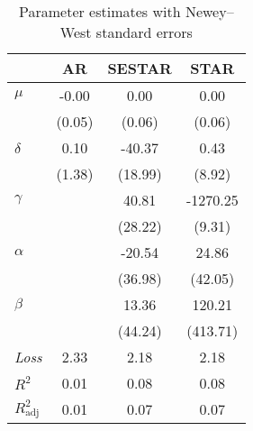\begin{table}[htbp]
\centering
\caption{Parameter estimates with Newey--West standard errors}
\begin{tabular}{lccc}
\toprule
 & AR & SESTAR & STAR \\
\midrule
$\mu$ & -0.00 & 0.00 & 0.00 \\
 & (0.05) & (0.06) & (0.06) \\
$\delta$ & 0.10 & -40.37 & 0.43 \\
 & (1.38) & (18.99) & (8.92) \\
$\gamma$ &  & 40.81 & -1270.25 \\
 &  & (28.22) & (9.31) \\
$\alpha$ &  & -20.54 & 24.86 \\
 &  & (36.98) & (42.05) \\
$\beta$ &  & 13.36 & 120.21 \\
 &  & (44.24) & (413.71) \\
\addlinespace
\emph{Loss} & 2.33 & 2.18 & 2.18 \\
$R^2$ & 0.01 & 0.08 & 0.08 \\
$R^2_{\text{adj}}$ & 0.01 & 0.07 & 0.07 \\
\bottomrule
\end{tabular}
\end{table}